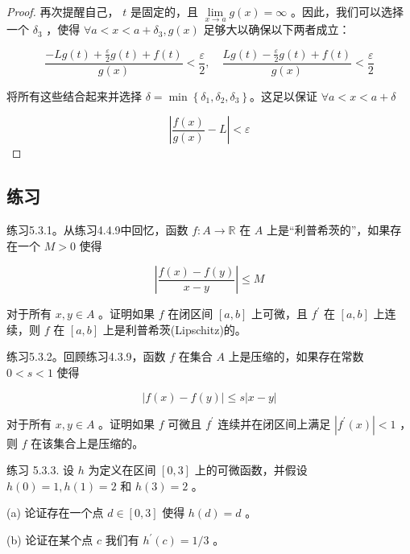 \begin{proof}
再次提醒自己， \(t\) 是固定的，且 \(\mathop{\lim }\limits_{{x \rightarrow  a}}g\left( x\right)  = \infty\) 。因此，我们可以选择一个 \({\delta }_{3}\) ，使得 \(\forall a < x < a + {\delta }_{3}, g\left( x\right)\) 足够大以确保以下两者成立：

\[
\frac{-{Lg}\left( t\right)  + \frac{\varepsilon }{2}g\left( t\right)  + f\left( t\right) }{g\left( x\right) }< \frac{\varepsilon}{2},\quad\frac{{Lg}\left( t\right)  - \frac{\varepsilon }{2}g\left( t\right)  + f\left( t\right) }{g\left( x\right) }< \frac{\varepsilon}{2}
\]

将所有这些结合起来并选择 \(\delta  = \min \left\{  {{\delta }_{1},{\delta }_{2},{\delta }_{3}}\right\}\)。这足以保证 $\forall a < x < a + \delta$

\[
\left| {\frac{f\left( x\right) }{g\left( x\right) } - L}\right|  < \varepsilon
\]
\end{proof}

\subsection{练习}

练习5.3.1。从练习4.4.9中回忆，函数 \(f : A \rightarrow  \mathbb{R}\) 在 \(A\) 上是“利普希茨的”，如果存在一个 \(M > 0\) 使得

\[
\left| \frac{f\left( x\right)  - f\left( y\right) }{x - y}\right|  \leq  M
\]

对于所有 \(x,y \in  A\) 。证明如果 \(f\) 在闭区间 \(\left\lbrack  {a,b}\right\rbrack\) 上可微，且 \({f}^{\prime }\) 在 \(\left\lbrack  {a,b}\right\rbrack\) 上连续，则 \(f\) 在 \(\left\lbrack  {a,b}\right\rbrack\) 上是利普希茨(Lipschitz)的。

练习5.3.2。回顾练习4.3.9，函数 \(f\) 在集合 \(A\) 上是压缩的，如果存在常数 \(0 < s < 1\) 使得

\[
\left| {f\left( x\right)  - f\left( y\right) }\right|  \leq  s\left| {x - y}\right|
\]

对于所有 \(x,y \in  A\) 。证明如果 \(f\) 可微且 \({f}^{\prime }\) 连续并在闭区间上满足 \(\left| {{f}^{\prime }\left( x\right) }\right|  < 1\) ，则 \(f\) 在该集合上是压缩的。

练习 5.3.3. 设 \(h\) 为定义在区间 \(\left\lbrack  {0,3}\right\rbrack\) 上的可微函数，并假设 \(h\left( 0\right)  = 1,h\left( 1\right)  = 2\) 和 \(h\left( 3\right)  = 2\) 。

(a) 论证存在一个点 \(d \in  \left\lbrack  {0,3}\right\rbrack\) 使得 \(h\left( d\right)  = d\) 。

(b) 论证在某个点 \(c\) 我们有 \({h}^{\prime }\left( c\right)  = 1/3\) 。

